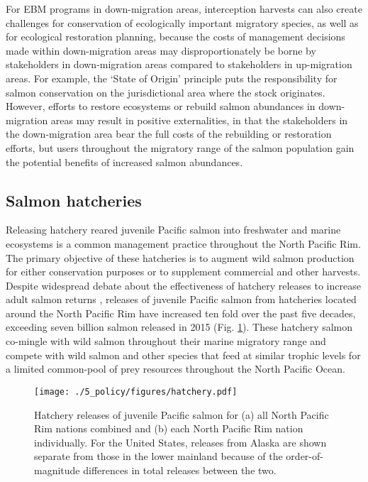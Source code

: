 For EBM programs in down-migration areas, interception harvests can also
create challenges for conservation of ecologically important migratory species,
as well as for ecological restoration planning, because the costs of management
decisions made within down-migration areas may disproportionately be borne by
stakeholders in down-migration areas compared to stakeholders in
up-migration areas. For example, the `State of Origin' principle puts the
responsibility for salmon conservation on the jurisdictional area where the
stock originates. However, efforts to restore ecosystems or rebuild salmon
abundances in down-migration areas may result in positive externalities, in that
the stakeholders in the down-migration area bear the full costs of the
rebuilding or restoration efforts, but users throughout the migratory range of
the salmon population gain the potential benefits of increased salmon
abundances.


\subsection{Salmon hatcheries}

Releasing hatchery reared juvenile Pacific salmon into freshwater and marine
ecosystems is a common management practice throughout the North Pacific Rim. The
primary objective of these hatcheries is to augment wild salmon production for
either conservation purposes or to supplement commercial and other harvests.
Despite widespread debate about the effectiveness of hatchery releases to
increase adult salmon returns \citep{Hilborn2000a, Wertheimer2001a,
Hilborn2001a}, releases of juvenile Pacific salmon from hatcheries located
around the North Pacific Rim have increased ten fold over the past five decades,
exceeding seven billion salmon released in 2015 (Fig. \ref{fig:ebm:3}). These
hatchery salmon co-mingle with wild salmon throughout their marine migratory
range and compete with wild salmon and other species that feed at similar
trophic levels for a limited common-pool of prey resources throughout the North
Pacific Ocean.

\begin{figure}[htbp]
  \centering \texttt{[image: ./5\_policy/figures/hatchery.pdf]}
  \caption[Hatchery releases of juvenile Pacific salmon from North Pacific Rim
           nations]{Hatchery releases of juvenile Pacific salmon for (a) all
           North Pacific Rim nations combined and (b) each North Pacific Rim
           nation individually. For the United States, releases from Alaska are
           shown separate from those in the lower mainland because of the
           order-of-magnitude differences in total releases between the two.}
  \label{fig:ebm:3}
\end{figure}


